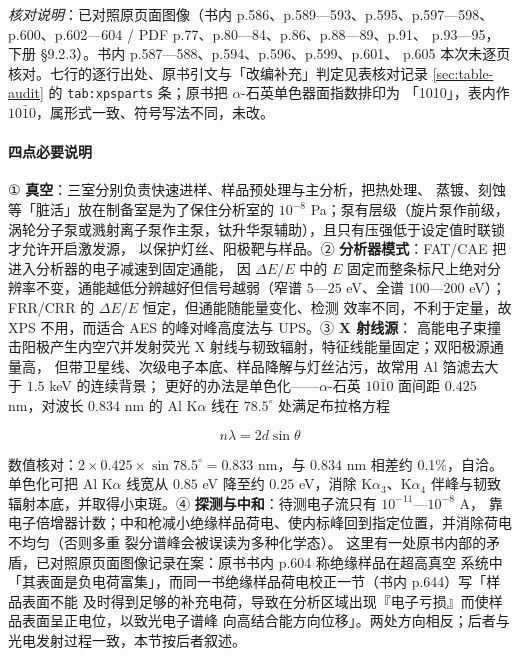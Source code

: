 \emph{核对说明}：已对照原页面图像（书内 p.586、p.589—593、p.595、p.597—598、
p.600、p.602—604 / PDF p.77、p.80—84、p.86、p.88—89、p.91、
p.93—95，下册 §9.2.3）。书内 p.587—588、p.594、p.596、p.599、p.601、
p.605 本次未逐页核对。七行的逐行出处、原书引文与「改编补充」判定见表核对记录
\ref{sec:table-audit} 的 \texttt{tab:xpsparts} 条；原书把 $\alpha$-石英单色器面指数排印为
「1010」，表内作 $10\bar{1}0$，属形式一致、符号写法不同，未改。


\paragraph{四点必要说明}① \textbf{真空}：三室分别负责快速进样、样品预处理与主分析，把热处理、
蒸镀、刻蚀等「脏活」放在制备室是为了保住分析室的 $10^{-8}$ Pa；泵有层级（旋片泵作前级，
涡轮分子泵或溅射离子泵作主泵，钛升华泵辅助），且只有压强低于设定值时联锁才允许开启激发源，
以保护灯丝、阳极靶与样品。② \textbf{分析器模式}：FAT/CAE 把进入分析器的电子减速到固定通能，
因 $\Delta E/E$ 中的 $E$ 固定而整条标尺上绝对分辨率不变，通能越低分辨越好但信号越弱（窄谱
$5$—$25$ eV、全谱 $100$—$200$ eV）；FRR/CRR 的 $\Delta E/E$ 恒定，但通能随能量变化、检测
效率不同，不利于定量，故 XPS 不用，而适合 AES 的峰对峰高度法与 UPS。③ \textbf{X 射线源}：
高能电子束撞击阳极产生内空穴并发射荧光 X 射线与韧致辐射，特征线能量固定；双阳极源通量高，
但带卫星线、次级电子本底、样品降解与灯丝沾污，故常用 Al 箔滤去大于 $1.5$ keV 的连续背景；
更好的办法是单色化——$\alpha$-石英 $10\bar{1}0$ 面间距 $0.425$ nm，对波长 $0.834$ nm 的
Al K$\alpha$ 线在 $78.5^{\circ}$ 处满足布拉格方程

\begin{equation}\label{eq:bragg-ch09}
n\lambda=2d\sin\theta
\end{equation}

数值核对：$2\times0.425\times\sin78.5^{\circ}=0.833$ nm，与 $0.834$ nm 相差约 0.1\%，自洽。
单色化可把 Al K$\alpha$ 线宽从 $0.85$ eV 降至约 $0.25$ eV，消除 K$\alpha_{3}$、K$\alpha_{4}$
伴峰与韧致辐射本底，并取得小束斑。④ \textbf{探测与中和}：待测电子流只有 $10^{-11}$—$10^{-8}$ A，
靠电子倍增器计数；中和枪减小绝缘样品荷电、使内标峰回到指定位置，并消除荷电不均匀（否则多重
裂分谱峰会被误读为多种化学态）。
这里有一处原书内部的矛盾，已对照原页面图像记录在案：原书书内 p.604 称绝缘样品在超高真空
系统中「其表面是负电荷富集」，而同一书绝缘样品荷电校正一节（书内 p.644）写「样品表面不能
及时得到足够的补充电荷，导致在分析区域出现『电子亏损』而使样品表面呈正电位，以致光电子谱峰
向高结合能方向位移」。两处方向相反；后者与光电发射过程一致，本节按后者叙述。

